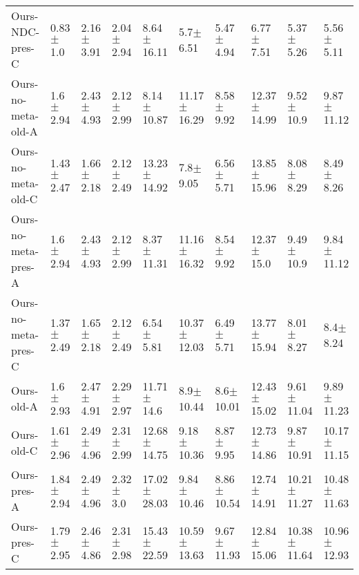 \begin{tabular}{llllllllll}
Ours-NDC-pres-C     &            0.83$\pm$1.0 &         2.16$\pm$3.91 &           2.04$\pm$2.94 &         8.64$\pm$16.11 &            5.7$\pm$6.51 &          5.47$\pm$4.94 &           6.77$\pm$7.51 &           5.37$\pm$5.26 &           5.56$\pm$5.11 \\
Ours-no-meta-old-A  &            1.6$\pm$2.94 &         2.43$\pm$4.93 &           2.12$\pm$2.99 &         8.14$\pm$10.87 &         11.17$\pm$16.29 &          8.58$\pm$9.92 &         12.37$\pm$14.99 &           9.52$\pm$10.9 &          9.87$\pm$11.12 \\
Ours-no-meta-old-C  &           1.43$\pm$2.47 &         1.66$\pm$2.18 &           2.12$\pm$2.49 &        13.23$\pm$14.92 &            7.8$\pm$9.05 &          6.56$\pm$5.71 &         13.85$\pm$15.96 &           8.08$\pm$8.29 &           8.49$\pm$8.26 \\
Ours-no-meta-pres-A &            1.6$\pm$2.94 &         2.43$\pm$4.93 &           2.12$\pm$2.99 &         8.37$\pm$11.31 &         11.16$\pm$16.32 &          8.54$\pm$9.92 &          12.37$\pm$15.0 &           9.49$\pm$10.9 &          9.84$\pm$11.12 \\
Ours-no-meta-pres-C &           1.37$\pm$2.49 &         1.65$\pm$2.18 &           2.12$\pm$2.49 &          6.54$\pm$5.81 &         10.37$\pm$12.03 &          6.49$\pm$5.71 &         13.77$\pm$15.94 &           8.01$\pm$8.27 &            8.4$\pm$8.24 \\
Ours-old-A          &            1.6$\pm$2.93 &         2.47$\pm$4.91 &           2.29$\pm$2.97 &         11.71$\pm$14.6 &           8.9$\pm$10.44 &          8.6$\pm$10.01 &         12.43$\pm$15.02 &          9.61$\pm$11.04 &          9.89$\pm$11.23 \\
Ours-old-C          &           1.61$\pm$2.96 &         2.49$\pm$4.96 &           2.31$\pm$2.99 &        12.68$\pm$14.75 &          9.18$\pm$10.36 &          8.87$\pm$9.95 &         12.73$\pm$14.86 &          9.87$\pm$10.91 &         10.17$\pm$11.15 \\
Ours-pres-A         &           1.84$\pm$2.94 &         2.49$\pm$4.96 &            2.32$\pm$3.0 &        17.02$\pm$28.03 &          9.84$\pm$10.46 &         8.86$\pm$10.54 &         12.74$\pm$14.91 &         10.21$\pm$11.27 &         10.48$\pm$11.63 \\
Ours-pres-C         &           1.79$\pm$2.95 &         2.46$\pm$4.86 &           2.31$\pm$2.98 &        15.43$\pm$22.59 &         10.59$\pm$13.63 &         9.67$\pm$11.93 &         12.84$\pm$15.06 &         10.38$\pm$11.64 &         10.96$\pm$12.93 \\

\end{tabular}
